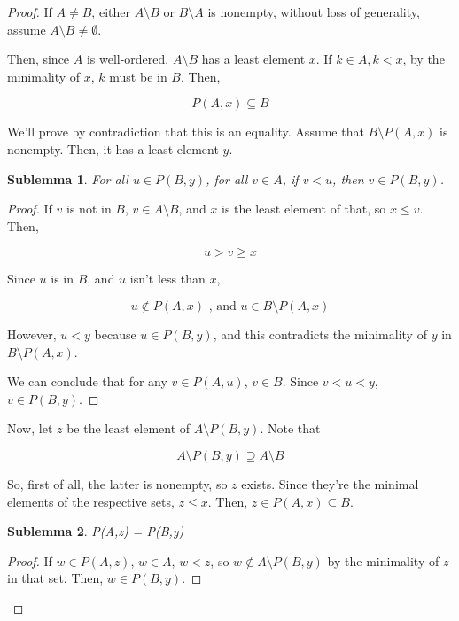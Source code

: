 \documentclass{article}
\newtheorem*{sublemma}{Sublemma}
\begin{document}
        \begin{proof}
        If $A \neq B$, either $A \setminus B$ or $B \setminus A$ is
        nonempty, without loss of generality, assume $A \setminus B \neq
        \emptyset$.

        Then, since $A$ is well-ordered, $A \setminus B$ has a least element
        $x$. If $k \in A, k < x$, by the minimality of $x$, $k$ must be in $B$.
        Then,

        \[P(A,x) \subseteq B\]

        We'll prove by contradiction that this is an equality. Assume that $B
        \setminus P(A,x)$ is nonempty. Then, it has a least element $y$.

        \begin{sublemma}
          For all $u \in P(B,y)$, for all $v \in A$, if $v < u$, then
          $v \in P(B,y)$.
        \end{sublemma}

        \begin{proof}
        If $v$ is not in $B$, $v \in A \setminus B$, and $x$ is the least
        element of that, so $x \leq v$. Then,

        \[u > v \geq x\]

        Since $u$ is in $B$, and $u$ isn't less than $x$,

        \[u \notin P(A,x) \text{ , and } u \in B \setminus P(A,x)\]

        However, $u < y$ because $u \in P(B,y)$, and this contradicts the
        minimality of $y$ in $B \setminus P(A,x)$.

        We can conclude that for any $v \in P(A,u)$, $v \in B$. Since $v < u <
        y$, $v \in P(B,y)$.
        \end{proof}

        Now, let $z$ be the least element of $A \setminus P(B,y)$. Note that

        \[A \setminus P(B,y) \supseteq A \setminus B\]

        So, first of all, the latter is nonempty, so $z$ exists. Since they're
        the minimal elements of the respective sets, $z \leq x$. Then, $z \in
        P(A,x) \subseteq B$.

        \begin{sublemma}
        P(A,z) = P(B,y)
        \end{sublemma}

        \begin{proof}
        If $w \in P(A,z)$, $w \in A$, $w < z$, so $w \notin A \setminus P(B,y)$
        by the minimality of $z$ in that set. Then, $w \in P(B,y)$.


\end{proof}
\end{proof}
\end{document}
